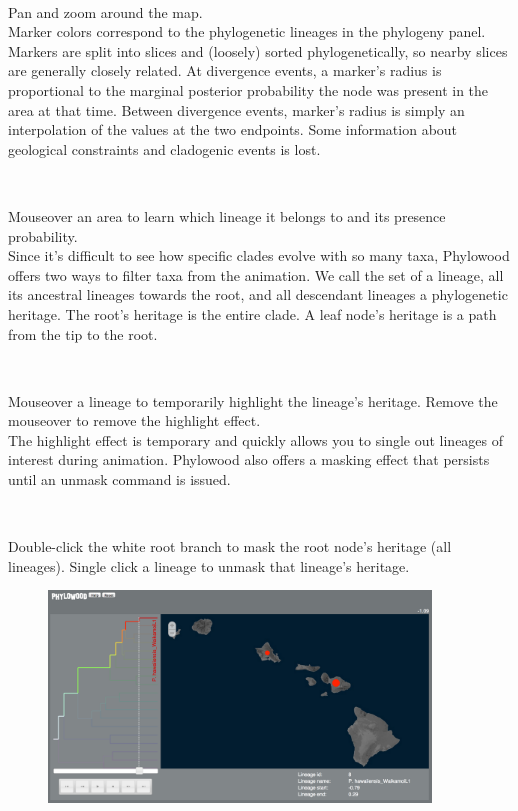 \documentclass[11pt]{article}
\newcommand{\impmark}{\strut\vadjust{\domark}}
\newcommand{\domark}{%
  \vbox to 0pt{
    \kern-\dp\strutbox
    \smash{\llap{$\rightarrow$\kern1em}}
    \vss
  }%
}
\begin{document}
\noindent \\ \impmark Pan and zoom around the map.\\

Marker colors correspond to the phylogenetic lineages in the phylogeny panel.
Markers are split into slices and (loosely) sorted phylogenetically, so nearby slices are generally closely related.
At divergence events, a marker's radius is proportional to the marginal posterior probability the node was present in the area at that time.
Between divergence events, marker's radius is simply an interpolation of the values at the two endpoints.
Some information about geological constraints and cladogenic events is lost.

\noindent \\ \impmark Mouseover an area to learn which lineage it belongs to and its presence probability. \\

Since it's difficult to see how specific clades evolve with so many taxa, Phylowood offers two ways to filter taxa from the animation.
We call the set of a lineage, all its ancestral lineages towards the root, and all descendant lineages a phylogenetic heritage.
The root's heritage is the entire clade.
A leaf node's heritage is a path from the tip to the root.

\noindent \\ \impmark Mouseover a lineage to temporarily highlight the lineage's heritage. Remove the mouseover to remove the highlight effect. \\

The highlight effect is temporary and quickly allows you to single out lineages of interest during animation.
Phylowood also offers a masking effect that persists until an unmask command is issued.

\noindent \\ \impmark Double-click the white root branch to mask the root node's heritage (all lineages). Single click a lineage to unmask that lineage's heritage. \\

\begin{figure}[H]
\centering
\includegraphics[width=4in]{figures/phw_br19}
\end{figure}
\end{document}
